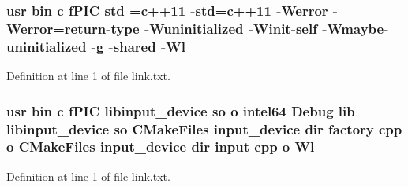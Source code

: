 \subsubsection[{\texorpdfstring{std}{std}}]{\setlength{\rightskip}{0pt plus 5cm}usr bin {\bf c} f\+P\+IC std ={\bf c}++11 -\/std={\bf c}++11 -\/Werror -\/Werror=return-\/type -\/Wuninitialized -\/Winit-\/self -\/Wmaybe-\/uninitialized -\/g -\/shared -\/{\bf Wl}}\hypertarget{common_2input__devices_2CMakeFiles_2input__device_8dir_2link_8txt_a5f87c8f8e33670f7c8c5221b6be1bcc4}{}\label{common_2input__devices_2CMakeFiles_2input__device_8dir_2link_8txt_a5f87c8f8e33670f7c8c5221b6be1bcc4}


Definition at line 1 of file link.\+txt.

\subsubsection[{\texorpdfstring{Wl}{Wl}}]{\setlength{\rightskip}{0pt plus 5cm}usr bin {\bf c} f\+P\+IC libinput\+\_\+device {\bf so} o intel64 Debug lib libinput\+\_\+device {\bf so} C\+Make\+Files input\+\_\+device dir factory cpp o C\+Make\+Files input\+\_\+device dir input cpp o Wl}\hypertarget{common_2input__devices_2CMakeFiles_2input__device_8dir_2link_8txt_a4b35f26da33033cb4cf93156e111b3d1}{}\label{common_2input__devices_2CMakeFiles_2input__device_8dir_2link_8txt_a4b35f26da33033cb4cf93156e111b3d1}


Definition at line 1 of file link.\+txt.

